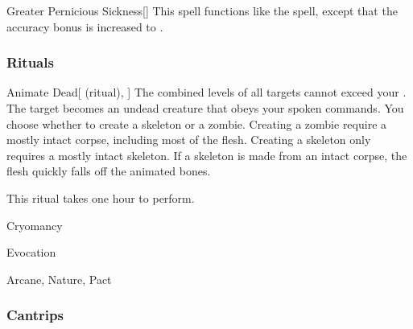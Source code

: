 \lowercase{\hypertarget{spell:Greater Pernicious Sickness}{}}\label{spell:Greater Pernicious Sickness}
\begin{freeability}[Rank 6]{\hypertarget{spell:Greater Pernicious Sickness}{Greater Pernicious Sickness}}[]
This spell functions like the  spell, except that the accuracy bonus is increased to .
\end{freeability}
\vspace{0.25em}



\subsubsection{Rituals}


\lowercase{\hypertarget{spell:Animate Dead}{}}\label{spell:Animate Dead}
\begin{attuneability}[Rank 3]{\hypertarget{spell:Animate Dead}{Animate Dead}}[ (ritual), ]
The combined levels of all targets cannot exceed your .
The target becomes an undead creature that obeys your spoken commands.
You choose whether to create a skeleton or a zombie.
Creating a zombie require a mostly intact corpse, including most of the flesh.
Creating a skeleton only requires a mostly intact skeleton.
If a skeleton is made from an intact corpse, the flesh quickly falls off the animated bones.

This ritual takes one hour to perform.
\end{attuneability}
\vspace{0.25em}


\newpage
\begin{spellsection}{Cryomancy}

\begin{spellheader}
\end{spellheader}


 Evocation

 Arcane, Nature, Pact

\subsubsection{Cantrips}


\end{spellsection}


